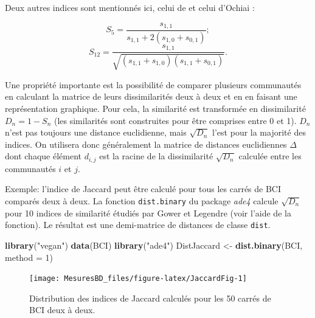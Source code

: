 \documentclass[
  11pt,
  french,
  a4paper,
  extrafontsizes,onecolumn,openright
  ]{memoir}
\newenvironment{Shaded}{\begin{snugshade}}{\end{snugshade}}
\newcommand{\DataTypeTok}[1]{\textcolor[rgb]{0.13,0.29,0.53}{#1}}
\newcommand{\DecValTok}[1]{\textcolor[rgb]{0.00,0.00,0.81}{#1}}
\newcommand{\KeywordTok}[1]{\textcolor[rgb]{0.13,0.29,0.53}{\textbf{#1}}}
\newcommand{\NormalTok}[1]{#1}
\newcommand{\StringTok}[1]{\textcolor[rgb]{0.31,0.60,0.02}{#1}}
\begin{document}
Deux autres indices sont mentionnés ici, celui de \textcite{Sokal1963} et celui d'Ochiai \autocite*{Ochiai1957}:

\begin{equation}
  \label{eq:S5}
  S_5 = \frac{s_{1,1}}{s_{1,1}+2 \left(s_{1,0}+s_{0,1}\right)};
\end{equation}
\begin{equation}
  \label{eq:S12}
  S_{12} = \frac{s_{1,1}}{\sqrt{\left(s_{1,1}+s_{1,0}\right)\left(s_{1,1}+s_{0,1}\right)}}.
\end{equation}

Une propriété importante est la possibilité de comparer plusieurs communautés en calculant la matrice de leurs dissimilarités deux à deux et en en faisant une représentation graphique.
Pour cela, la similarité est transformée en dissimilarité \(D_n=1-S_n\) (les similarités sont construites pour être comprises entre 0 et 1).
\(D_n\) n'est pas toujours une distance euclidienne, mais \(\sqrt{D_n}\) l'est pour la majorité des indices.
On utilisera donc généralement la matrice de distances euclidiennes \(\Delta\) dont chaque élément \(d_{i,j}\) est la racine de la dissimilarité \(\sqrt{D_n}\) calculée entre les communautés \(i\) et \(j\).

Exemple: l'indice de Jaccard peut être calculé pour tous les carrés de BCI comparés deux à deux.
La fonction \texttt{dist.binary} du package \emph{ade4} calcule \(\sqrt{D_n}\) pour 10 indices de similarité étudiés par Gower et Legendre (voir l'aide de la fonction).
Le résultat est une demi-matrice de distances de classe \texttt{dist}.

\scriptsize

\begin{Shaded}
\begin{Highlighting}[]
\KeywordTok{library}\NormalTok{(}\StringTok{"vegan"}\NormalTok{)}
\KeywordTok{data}\NormalTok{(BCI)}
\KeywordTok{library}\NormalTok{(}\StringTok{"ade4"}\NormalTok{)}
\NormalTok{DistJaccard <-}\StringTok{ }\KeywordTok{dist.binary}\NormalTok{(BCI, }\DataTypeTok{method =} \DecValTok{1}\NormalTok{)}
\end{Highlighting}
\end{Shaded}

\normalsize



\scriptsize

\begin{figure}

{\centering \texttt{[image: MesuresBD\_files/figure-latex/JaccardFig-1]} 

}

\caption{Distribution des indices de Jaccard calculés pour les 50 carrés de BCI deux à deux.}\label{fig:JaccardFig}
\end{figure}
\end{document}
